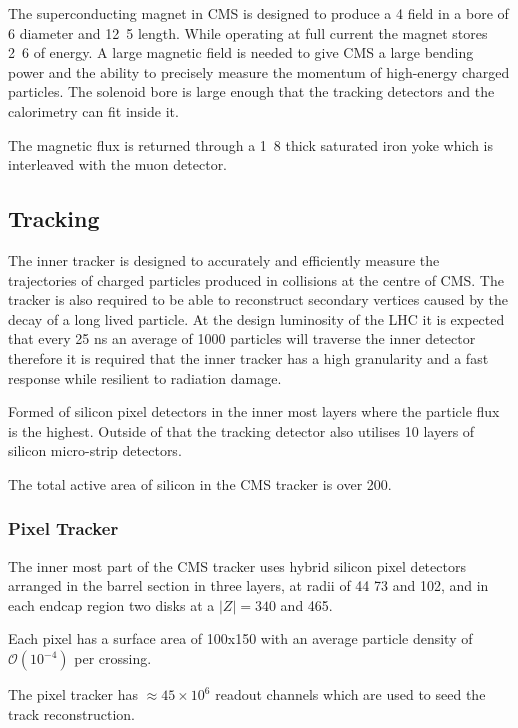The superconducting magnet in CMS is designed to produce a \unit{4}{\tesla}
field in a bore of 
\unit{6}{\meter} diameter and \unit{12.5}{\meter} length.
While operating at full current the magnet stores \unit{2.6}{\giga\joule} of 
energy.
A large magnetic field is needed to give CMS a large bending power and the
ability to precisely measure the momentum of high-energy charged particles.
The solenoid bore is large enough that the tracking detectors and the
calorimetry can fit inside it.\cite{cms}

The magnetic flux is returned through a \unit{1.8}{\meter} thick saturated iron
yoke which is interleaved with the muon detector.

\subsection{Tracking}
The inner tracker is designed to accurately and efficiently measure the
trajectories of charged particles produced in collisions at the centre of CMS.
The tracker is also required to be able to reconstruct secondary vertices
caused by the decay of a long lived particle.
At the design luminosity of the LHC it is expected that every 25 ns an average
of 1000 particles will traverse the 
inner detector therefore it is required that the inner tracker has a high
granularity and a fast response while 
resilient to radiation damage. 

Formed of silicon pixel detectors in the inner most layers where the particle
flux is the highest.
Outside of that the tracking detector also utilises 10 layers of silicon
micro-strip detectors.

The total active area of silicon in the CMS tracker is over
\unit{200}{\meter\squared}.\cite{cms}

\subsubsection{Pixel Tracker}
The inner most part of the CMS tracker uses hybrid silicon pixel detectors arranged in
the barrel section in three layers, at radii of  44 73 and \unit{102}{\mm}, and in
each endcap region two disks at a $|Z|=340$ and \unit{465}{\mm}.

Each pixel has a surface area of \unit{100x150}{\micron} with an
average particle density of $\mathcal{O}(10^{-4})$ per crossing.

The pixel tracker has $\approx 45\times 10^{6}$ readout channels which are used
to seed the track reconstruction.

